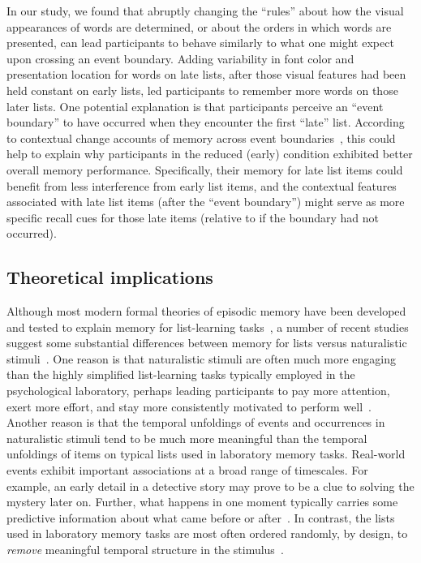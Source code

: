 \documentclass[11pt]{article}
\begin{document}
In our study, we found that abruptly changing the ``rules'' about how the
visual appearances of words are determined, or about the orders in which words
are presented, can lead participants to behave similarly to what one might
expect upon crossing an event boundary. Adding variability in font color and
presentation location for words on late lists, after those visual features had
been held constant on early lists, led participants to remember more words on
those later lists. One potential explanation is that participants perceive an
``event boundary'' to have occurred when they encounter the first ``late''
list. According to contextual change accounts of memory across event
boundaries~\citep[e.g.,][]{SahaKell02, PettEtal16, GoldEtal17, FlorEtal17},
this could help to explain why participants in the reduced (early) condition
exhibited better overall memory performance. Specifically, their memory for
late list items could benefit from less interference from early list items, and
the contextual features associated with late list items (after the ``event
boundary'') might serve as more specific recall cues for those late items
(relative to if the boundary had not occurred).


\subsection*{Theoretical implications}

Although most modern formal theories of episodic memory have been developed and
tested to explain memory for list-learning tasks~\citep{Kaha20}, a number of
recent studies suggest some substantial differences between memory for lists
versus naturalistic stimuli~\citep[e.g., real-world experiences, narratives,
films, etc.;][]{NastEtal20, HeusEtal21, Mann21a, LeeEtal20}. One reason is that
naturalistic stimuli are often much more engaging than the highly simplified
list-learning tasks typically employed in the psychological laboratory, perhaps
leading participants to pay more attention, exert more effort, and stay more
consistently motivated to perform well~\citep{NastEtal20}. Another reason is
that the temporal unfoldings of events and occurrences in naturalistic stimuli
tend to be much more meaningful than the temporal unfoldings of items on
typical lists used in laboratory memory tasks. Real-world events exhibit
important associations at a broad range of timescales. For example, an early
detail in a detective story may prove to be a clue to solving the mystery later
on. Further, what happens in one moment typically carries some predictive
information about what came before or after~\citep{XuEtal23}. In contrast, the
lists used in laboratory memory tasks are most often ordered randomly, by
design, to \textit{remove} meaningful temporal structure in the
stimulus~\citep{Kaha12}.
\end{document}
